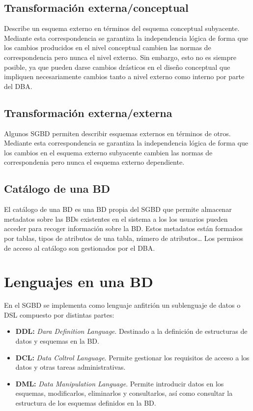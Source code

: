 \subsection{Transformación externa/conceptual}

Describe un esquema externo en términos del esquema conceptual subyacente.
Mediante esta correspondencia se garantiza la independencia lógica de forma que los cambios producidos en el nivel conceptual cambien las normas de correspondencia pero nunca el nivel externo.
Sin embargo, esto no es siempre posible, ya que pueden darse cambios drásticos en el diseño conceptual que impliquen necesariamente cambios tanto a nivel externo como interno por parte del DBA\@.

\subsection{Transformación externa/externa}

Algunos SGBD permiten describir esquemas externos en términos de otros.
Mediante esta correspondencia se garantiza la independencia lógica de forma que los cambios en el esquema externo subyacente cambien las normas de correspondenia pero nunca el esquema externo dependiente.

\subsection{Catálogo de una BD}

El catálogo de una BD es una BD propia del SGBD que permite almacenar metadatos sobre las BDs existentes en el sistema a los los usuarios pueden acceder para recoger información sobre la BD\@.
Estos metadatos están formados por tablas, tipos de atributos de una tabla, número de atributos\ldots
Los permisos de acceso al catálogo son gestionados por el DBA\@.

\section{Lenguajes en una BD}

En el SGBD se implementa como lenguaje anfitrión un sublenguaje de datos o DSL compuesto por distintas partes:

\begin{itemize}
	\item\textbf{DDL:} \textit{Dara Definition Language}. Destinado a la definición de estructuras de datos y esquemas en la BD\@.
	\item\textbf{DCL:} \textit{Data Coltrol Language}. Permite gestionar los requisitos de acceso a los datos y otras tareas administrativas.
	\item\textbf{DML:} \textit{Data Manipulation Language}. Permite introducir datos en los esquemas, modificarlos, eliminarlos y consultarlos, así como consultar la estructura de los esquemas definidos en la BD\@.
\end{itemize}

